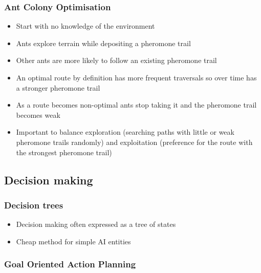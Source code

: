 \documentclass[a4paper]{article}
\begin{document}
\subsubsection{Ant Colony Optimisation}

\begin{itemize}
  \item
    Start with no knowledge of the environment

  \item
    Ants explore terrain while depositing a pheromone trail

  \item
    Other ants are more likely to follow an existing pheromone trail

  \item
    An optimal route by definition has more frequent traversals so over time has
    a stronger pheromone trail

  \item
    As a route becomes non-optimal ants stop taking it and the pheromone trail
    becomes weak

  \item
    Important to balance exploration (searching paths with little or weak
    pheromone trails randomly) and exploitation (preference for the route with
    the strongest pheromone trail)

\end{itemize}

\subsection{Decision making}

\subsubsection{Decision trees}

\begin{itemize}
  \item
    Decision making often expressed as a tree of states

  \item
    Cheap method for simple AI entities

\end{itemize}

\subsubsection{Goal Oriented Action Planning}
\end{document}
